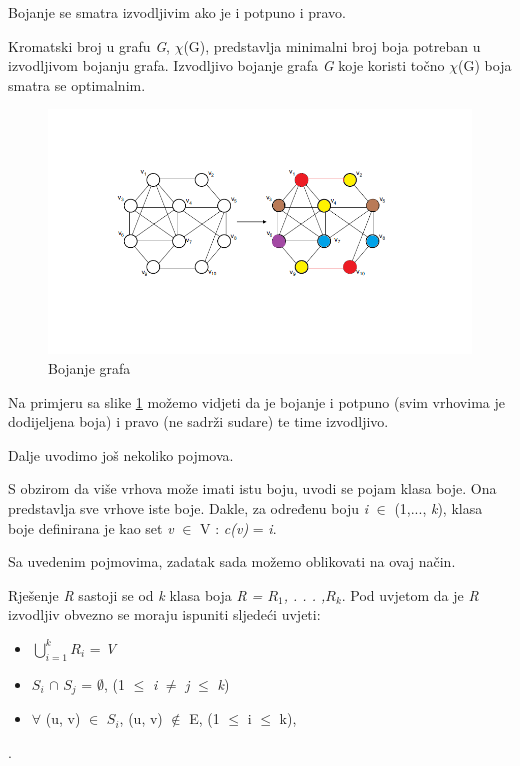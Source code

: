 \documentclass[times, utf8, zavrsni, numeric]{fer}
\begin{document}
Bojanje se smatra izvodljivim ako je i potpuno i pravo.

Kromatski broj u grafu \textit{G}, $\chi$(G), predstavlja minimalni broj boja potreban u izvodljivom bojanju grafa. Izvodljivo bojanje grafa \textit{G} koje koristi točno $\chi$(G) boja smatra se optimalnim.

\begin{figure}[h]
	\centering
	\includegraphics[width=1\columnwidth]{slike/bojanje-grafa.png}
	\caption{Bojanje grafa}
	\label{fig:bojanje-grafa}
\end{figure}

Na primjeru sa slike \ref{fig:bojanje-grafa} možemo vidjeti da je bojanje i potpuno (svim vrhovima je dodijeljena boja) i pravo (ne sadrži sudare) te time izvodljivo.


Dalje uvodimo još nekoliko pojmova.

S obzirom da više vrhova može imati istu boju, uvodi se pojam klasa boje. Ona predstavlja sve vrhove iste boje. Dakle, za određenu boju \textit{i} $\in$ {(1,..., \textit{k})}, klasa boje definirana je kao set {\textit{v} $\in$ V :\textit{ c(v)} = \textit{i}}.


Sa uvedenim pojmovima, zadatak sada možemo oblikovati na ovaj način.

Rješenje \textit{R} sastoji se od \textit{k} klasa boja  \textit{R = {$R_1$, . . . ,$R_k$}}. Pod uvjetom da je \textit{R} izvodljiv obvezno se moraju ispuniti sljedeći uvjeti:
\begin{itemize}
	\item $\bigcup\limits_{i=1}^{k} R_{i}$ = \textit{V}
	\item $S_{i}$ $\cap$ $S_{j}$ = $\emptyset$, (1 $\leq$ \textit{i} $\neq$ \textit{j} $\leq$ \textit{k})
	\item $\forall$ (u, v) $\in$ $S_{i}$, (u, v) $\notin$ E, (1 $\leq$ i $\leq$ k),
	
\end{itemize}.
\end{document}

